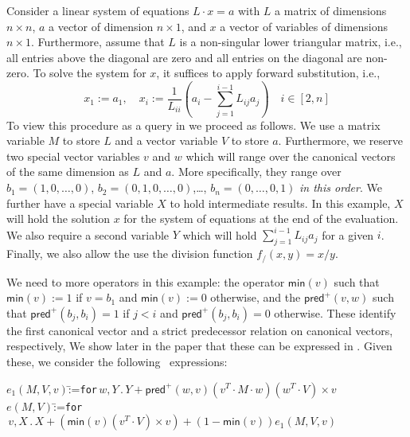 \begin{example}
Consider a linear system of equations $L\cdot x=a$ with $L$ a matrix of dimensions $n\times n$, $a$ a vector of dimension $n\times 1$, and $x$ a vector of variables of dimensions $n\times 1$. Furthermore, assume that $L$ is a non-singular lower triangular matrix, i.e., all entries above the diagonal are zero and all entries on the diagonal are non-zero. To solve the system for $x$, it suffices to apply forward substitution, i.e.,
$$	x_1:= a_1, \quad
x_i:= \frac{1}{L_{ii}}\left(a_i -\sum_{j=1}^{i-1}L_{ij}a_j\right) \quad i\in[2,n]$$
To view this procedure as a query in \langfor we proceed as follows.
We use a matrix variable $M$ to store $L$ and a vector variable $V$ to store $a$.
Furthermore, we reserve two special vector variables $v$ and $w$ which will range over
the canonical vectors of the same dimension as $L$ and $a$. More specifically, they range
over $b_1=(1,0,\ldots,0)$, $b_2=(0,1,0,\ldots,0)$,\ldots, $b_n=(0,\ldots,0,1)$ \textit{in this order}. We further have a special variable $X$ to hold intermediate results. In this example,
$X$ will hold the solution $x$ for the system of equations at the end of the evaluation. We also
require a second variable $Y$ which will hold $\sum_{j=1}^{i-1}L_{ij}a_j$ for a given $i$. Finally,
we also allow the use the division function $f_/(x,y)=x/y$.

We need to more operators in this example: 
the operator $\mathsf{min}(v)$ such that $\mathsf{min}(v):=1$ if $v=b_1$ and $\mathsf{min}(v):=0$ otherwise, and the $\mathsf{pred}^+(v,w)$ such that $\mathsf{pred}^+(b_j,b_i)=1$
 if $j<i$ and $\mathsf{pred}^+(b_j,b_i)=0$ otherwise. These identify the first canonical vector and a strict predecessor relation on canonical vectors, respectively, We show later in the paper that these can be expressed in \langfor. Given these, we consider the following \langfor\ expressions:
\begin{tabbing}
$e_1(M,V,v)$\=:=\texttt{for}$\,w,Y\,.\, Y + \mathsf{pred}^+(w,v) (v^T\cdot M\cdot w)(w^T\cdot V)\times v$\\
$e(M,V)$\=:=\texttt{for}$\,v,X\,.\, X + (\mathsf{min}(v)(v^T\cdot V)\times v) +(1-\mathsf{min}(v))e_1(M,V,v)$
\end{tabbing}
\end{example}

